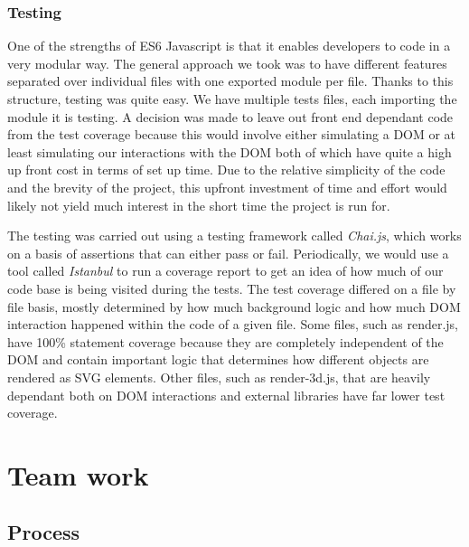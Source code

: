 \documentclass[a4paper]{report}
\begin{document}
	\subsection{Testing} \label{sec:frontend-tests}
	\par One of the strengths of ES6 Javascript is that it enables developers to code in a very modular way. The general approach we took was to have different features separated over individual files with one exported module per file. Thanks to this structure, testing was quite easy. We have multiple tests files, each importing the module it is testing. A decision was made to leave out front end dependant code from the test coverage because this would involve either simulating a DOM or at least simulating our interactions with the DOM both of which have quite a high up front cost in terms of set up time. Due to the relative simplicity of the code and the brevity of the project, this upfront investment of time and effort would likely not yield much interest in the short time the project is run for. \newline
	\par The testing was carried out using a testing framework called \textit{Chai.js}, which works on a basis of assertions that can either pass or fail. Periodically, we would use a tool called \textit{Istanbul} to run a coverage report to get an idea of how much of our code base is being visited during the tests. The test coverage differed on a file by file basis, mostly determined by how much background logic and how much DOM interaction happened within the code of a given file. Some files, such as render.js, have 100\% statement coverage because they are completely independent of the DOM and contain important logic that determines how different objects are rendered as SVG elements. Other files, such as render-3d.js, that are heavily dependant both on DOM interactions and external libraries have far lower test coverage.\newline
	
	\chapter{Team work}\label{chapter:teamwork}
	\section{Process} \label{sec:process}
	
\end{document}
